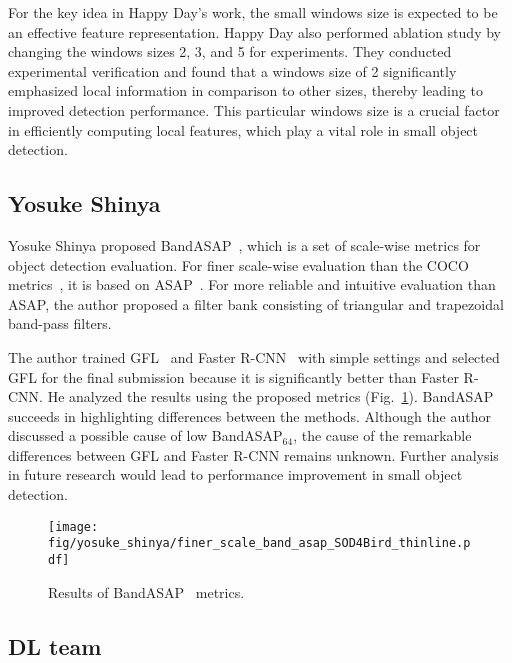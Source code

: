 \documentclass{mva_style}
\begin{document}
For the key idea in Happy Day's work, the small windows size is expected to be an effective feature representation. Happy Day also performed ablation study by changing the windows sizes 2, 3, and 5 for experiments. They conducted experimental verification and found that a windows size of 2 significantly emphasized local information in comparison to other sizes, thereby leading to improved detection performance. This particular windows size is a crucial factor in efficiently computing local features, which play a vital role in small object detection.




\subsection{Yosuke Shinya}

Yosuke Shinya proposed BandASAP~\cite{BandRe_MVAW2023}, which is a set of scale-wise metrics for object detection evaluation.
For finer scale-wise evaluation than the COCO metrics~\cite{COCO_ECCV2014, cocoapi},
it is based on ASAP~\cite{USB_Shinya_BMVC2022}.
For more reliable and intuitive evaluation than ASAP,
the author proposed a filter bank consisting of triangular and trapezoidal band-pass filters.

The author trained GFL~\cite{GFL_NeurIPS2020} and Faster R-CNN~\cite{Faster_R-CNN_NIPS2015} with simple settings
and selected GFL for the final submission because it is significantly better than Faster R-CNN.
He analyzed the results using the proposed metrics (Fig.~\ref{fig:band_asap_sod4bird}).
BandASAP succeeds in highlighting differences between the methods.
Although the author discussed a possible cause of low BandASAP$_{64}$, the cause of the remarkable differences between GFL and Faster R-CNN remains unknown.
Further analysis in future research would lead to performance improvement in small object detection.

\begin{figure}[t]
  \centering
  \texttt{[image: fig/yosuke\_shinya/finer\_scale\_band\_asap\_SOD4Bird\_thinline.pdf]}
  \caption{
    Results of BandASAP~\cite{BandRe_MVAW2023} metrics.
  }
  \label{fig:band_asap_sod4bird}
  \vspace{-1.5em}
\end{figure}

\subsection{DL team}
\end{document}
